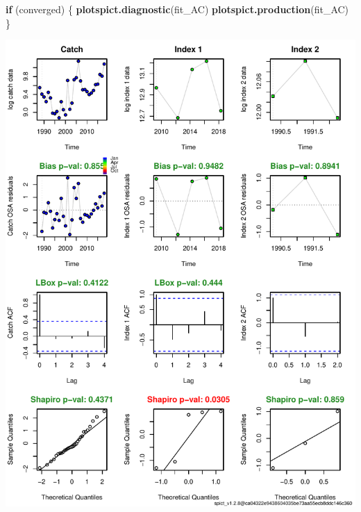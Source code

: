 \documentclass[
]{article}
\newenvironment{Shaded}{\begin{snugshade}}{\end{snugshade}}
\newcommand{\ControlFlowTok}[1]{\textcolor[rgb]{0.13,0.29,0.53}{\textbf{#1}}}
\newcommand{\KeywordTok}[1]{\textcolor[rgb]{0.13,0.29,0.53}{\textbf{#1}}}
\newcommand{\NormalTok}[1]{#1}
\begin{document}
\begin{Shaded}
\begin{Highlighting}[]
\ControlFlowTok{if}\NormalTok{ (converged) \{}
  \KeywordTok{plotspict.diagnostic}\NormalTok{(fit_AC)}
  \KeywordTok{plotspict.production}\NormalTok{(fit_AC)}
\NormalTok{\}}
\end{Highlighting}
\end{Shaded}

\includegraphics{aru.27.123a4_SPiCT_WD_files/figure-latex/diagnostics_scenario_4-1.pdf}
\end{document}
